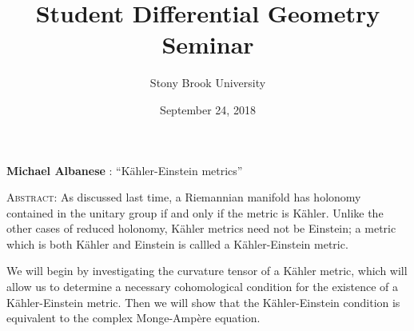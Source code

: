 \documentclass[11pt]{article}
\title{Student Differential Geometry Seminar}
\author{Stony Brook University}
\date{September 24, 2018}
\makeatletter
\newcommand{\spe@ker}{}
\newcommand{\t@lktitle}{}
\newcommand{\@ffili@tion}{}
\newcommand{\speaker}[1]{%
  \renewcommand{\spe@ker}{#1}}
\newcommand{\talktitle}[1]{%
  \renewcommand{\t@lktitle}{#1}}
\newcommand{\affiliation}[1]{%
  \renewcommand{\@ffili@tion}{#1}}
\renewenvironment{abstract}{%
  \begin{center}
    \large
    \textbf{\spe@ker} %
    : ``\t@lktitle''
  \end{center}
  \begin{trivlist}
  \item\textsc{Abstract:}}{%
  \end{trivlist}}
\makeatother
\begin{document}
\maketitle
\thispagestyle{empty}

\speaker{Michael Albanese}
\talktitle{K\"ahler-Einstein metrics}

\begin{abstract}
As discussed last time, a Riemannian manifold has holonomy contained in the unitary group if and only if the metric is K\"ahler. Unlike the other cases of reduced holonomy, K\"ahler metrics need not be Einstein; a metric which is both K\"ahler and Einstein is callled a K\"ahler-Einstein metric.

We will begin by investigating the curvature tensor of a K\"ahler metric, which will allow us to determine a necessary cohomological condition for the existence of a K\"ahler-Einstein metric. Then we will show that the K\"ahler-Einstein condition is equivalent to the complex Monge-Amp\`ere equation. 
\end{abstract}
\end{document}
